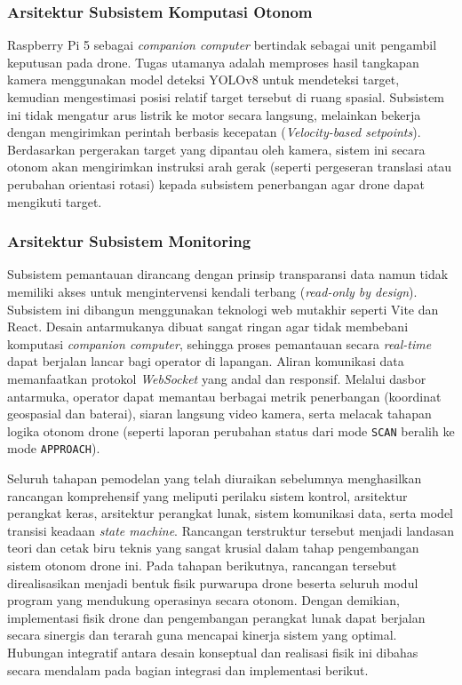 \subsubsection{Arsitektur Subsistem Komputasi Otonom}
Raspberry Pi 5 sebagai \textit{companion computer} bertindak sebagai unit pengambil keputusan pada drone. Tugas utamanya adalah memproses hasil tangkapan kamera menggunakan model deteksi YOLOv8 untuk mendeteksi target, kemudian mengestimasi posisi relatif target tersebut di ruang spasial. Subsistem ini tidak mengatur arus listrik ke motor secara langsung, melainkan bekerja dengan mengirimkan perintah berbasis kecepatan (\textit{Velocity-based setpoints}). Berdasarkan pergerakan target yang dipantau oleh kamera, sistem ini secara otonom akan mengirimkan instruksi arah gerak (seperti pergeseran translasi atau perubahan orientasi rotasi) kepada subsistem penerbangan agar drone dapat mengikuti target.

\subsubsection{Arsitektur Subsistem Monitoring}
Subsistem pemantauan dirancang dengan prinsip transparansi data namun tidak memiliki akses untuk mengintervensi kendali terbang (\textit{read-only by design}). Subsistem ini dibangun menggunakan teknologi web mutakhir seperti Vite dan React. Desain antarmukanya dibuat sangat ringan agar tidak membebani komputasi \textit{companion computer}, sehingga proses pemantauan secara \textit{real-time} dapat berjalan lancar bagi operator di lapangan. Aliran komunikasi data memanfaatkan protokol \textit{WebSocket} yang andal dan responsif. Melalui dasbor antarmuka, operator dapat memantau berbagai metrik penerbangan (koordinat geospasial dan baterai), siaran langsung video kamera, serta melacak tahapan logika otonom drone (seperti laporan perubahan status dari mode \texttt{SCAN} beralih ke mode \texttt{APPROACH}).

Seluruh tahapan pemodelan yang telah diuraikan sebelumnya menghasilkan rancangan komprehensif yang meliputi perilaku sistem kontrol, arsitektur perangkat keras, arsitektur perangkat lunak, sistem komunikasi data, serta model transisi keadaan \textit{state machine}. Rancangan terstruktur tersebut menjadi landasan teori dan cetak biru teknis yang sangat krusial dalam tahap pengembangan sistem otonom drone ini. Pada tahapan berikutnya, rancangan tersebut direalisasikan menjadi bentuk fisik purwarupa drone beserta seluruh modul program yang mendukung operasinya secara otonom. Dengan demikian, implementasi fisik drone dan pengembangan perangkat lunak dapat berjalan secara sinergis dan terarah guna mencapai kinerja sistem yang optimal. Hubungan integratif antara desain konseptual dan realisasi fisik ini dibahas secara mendalam pada bagian integrasi dan implementasi berikut.

